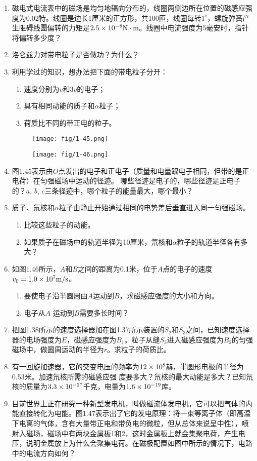 \begin{enumerate}
\item 磁电式电流表中的磁场是均匀地辐向分布的，线圈两侧边所在位置的磁感应强度为0.02特。线圈是边长1厘米的正方形，共100匝，线圈每转$1^{\circ}$，螺旋弹簧产生阻碍线團偏转的力矩是$2.5\times10^{-8}{\rm N}\cdot {\rm m}$。线圈中电流强度为5毫安时，指针将偏转多少度？
\item 洛仑兹力对带电粒子是否做功？为什么？    
\item 利用学过的知识，想办法把下面的带电粒子分开：
\begin{enumerate}
    \item 速度分别为$v$和$3v$的电子；
    \item 具有相同动能的质子和$\alpha$粒子；
    \item 荷质比不同的带正电的粒子。
\end{enumerate}
\begin{figure}[htp]\centering
	\texttt{[image: fig/1-45.png]}
	\caption{ }
\end{figure}
\begin{figure}[htp]\centering
	\texttt{[image: fig/1-46.png]}
	\caption{ }
\end{figure}
\item 图1.45表示由$O$点发出的电子和正电子（质量和电量跟电子相同，但带的是正电荷）在匀强磁场中运动的径迹。
哪些径迹是电子的，哪些径迹是正电子的？$a$, $b$, $c$三条径迹中，哪个粒子的能量最大，哪个最小？
\item 质子、氘核和$\alpha$粒子由静止开始通过相同的电势差后垂直进入同一匀强磁场。
\begin{enumerate}
    \item 比较这些粒子的动能。
    \item 如果质子在磁场中的轨道半径为10厘米，氘核和$\alpha$粒子的轨道半径各有多大？
\end{enumerate}
\item 如图1.46所示，$A$和$B$之间的距离为0.1米，位于$A$点的电子的速度$v_0=1.0\times10^7\text{m}/\text{s}$。
\begin{enumerate}
    \item 要使电子沿半圆周由$A$运动到$B$，求磁感应强度的大小和方向。
    \item 电子从$A$
运动到$B$需要多长时间？
\end{enumerate}
\item 把图1.38所示的速度选择器加在图1.37所示装置的$S_2$和$S_3$之间，已知速度选择器的电场强度为$E$，磁感应强度为$B_1$。粒子从缝$S_3$进入磁感应强度为$B_2$的匀强磁场中，做圆周运动的半径为$r$。求粒子的荷质比。
\item  有一回旋加速器，它的交变电压的频率为$12\times10^8$赫，半圆形电极的半径为0.53米。加速氘核所需的磁感应强
度要多大？氘核的最大动能是多大？已知氘核的质量为$3.3\times10^{-27}$千克，电量为$1.6\times10^{-19}$库。
\item 目前世界上正在研究一种新型发电机，叫做磁流体发电机，它可以把气体的内能直接转化为电能。图1.47表示出了它的发电原理：将一束等离子体（即高温下电离的气体，含有大量带正电和带负电的微粒，但从总体来说呈中性），喷射入磁场，磁场中有两块金属板1和2，这时金属板上就会集聚电荷，产生电压，说明金属放上为什么会聚集电荷。在磁极配置如图中所示的情况下，电路中的电流方向如何？


\end{enumerate}
